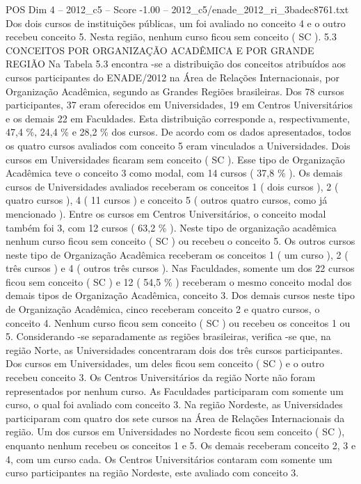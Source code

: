 \begin{textsample}{POS Dim 4 – 2012\_c5 – Score -1.00 – 2012\_c5/enade\_2012\_ri\_3badec8761.txt}
Dos dois cursos de instituições públicas, um foi avaliado no conceito 4 e o outro recebeu conceito 5.
Nesta região, nenhum curso ficou sem conceito ( SC ). 5.3 CONCEITOS POR ORGANIZAÇÃO ACADÊMICA E POR GRANDE REGIÃO Na Tabela 5.3 encontra -se a distribuição dos conceitos atribuídos aos cursos participantes do ENADE/2012 na Área de Relações Internacionais, por Organização Acadêmica, segundo as Grandes Regiões brasileiras.
Dos 78 cursos participantes, 37 eram oferecidos em Universidades, 19 em Centros Universitários e os demais 22 em Faculdades.
Esta distribuição corresponde a, respectivamente, 47,4 \%, 24,4 \% e 28,2 \% dos cursos.
De acordo com os dados apresentados, todos os quatro cursos avaliados com conceito 5 eram vinculados a Universidades.
Dois cursos em Universidades ficaram sem conceito ( SC ).
Esse tipo de Organização Acadêmica teve o conceito 3 como modal, com 14 cursos ( 37,8 \% ).
Os demais cursos de Universidades avaliados receberam os conceitos 1 ( dois cursos ), 2 ( quatro cursos ), 4 ( 11 cursos ) e conceito 5 ( outros quatro cursos, como já mencionado ).
Entre os cursos em Centros Universitários, o conceito modal também foi 3, com 12 cursos ( 63,2 \% ).
Neste tipo de organização acadêmica nenhum curso ficou sem conceito ( SC ) ou recebeu o conceito 5.
Os outros cursos neste tipo de Organização Acadêmica receberam os conceitos 1 ( um curso ), 2 ( três cursos ) e 4 ( outros três cursos ).
Nas Faculdades, somente um dos 22 cursos ficou sem conceito ( SC ) e 12 ( 54,5 \% ) receberam o mesmo conceito modal dos demais tipos de Organização Acadêmica, conceito 3.
Dos demais cursos neste tipo de Organização Acadêmica, cinco receberam conceito 2 e quatro cursos, o conceito 4.
Nenhum curso ficou sem conceito ( SC ) ou recebeu os conceitos 1 ou 5.
Considerando -se separadamente as regiões brasileiras, verifica -se que, na região Norte, as Universidades concentraram dois dos três cursos participantes.
Dos cursos em Universidades, um deles ficou sem conceito ( SC ) e o outro recebeu conceito 3.
Os Centros Universitários da região Norte não foram representados por nenhum curso.
As Faculdades participaram com somente um curso, o qual foi avaliado com conceito 3.
Na região Nordeste, as Universidades participaram com quatro dos sete cursos na Área de Relações Internacionais da região.
Um dos cursos em Universidades no Nordeste ficou sem conceito ( SC ), enquanto nenhum recebeu os conceitos 1 e 5.
Os demais receberam conceito 2, 3 e 4, com um curso cada.
Os Centros Universitários contaram com somente um curso participantes na região Nordeste, este avaliado com conceito 3.

\end{textsample}
